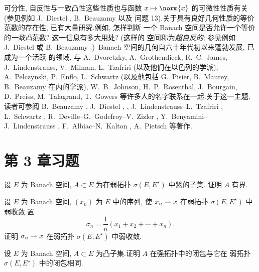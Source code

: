 可分性, 自反性与一致凸性这些性质也与函数 $x\mapsto\norm{x}$ 的可微性性质有关
(参见例如 J.~Diestel , B.~Beauzamy  以及
问题 13).关于具有良好几何性质的等价范数的存在性, 已有大量研究.例如, 怎样判断
一个 Banach 空间是否允许一个等价的\emph{一致凸}范数? 这一信息有多大用处? (这样的
空间称为\emph{超自反的}; 参见例如 J.~Diestel  或 B.~Beauzamy
.)\ Banach 空间的几何自六十年代初以来蓬勃发展, 已成为一个活跃
的领域, 与 A.~Dvoretzky, A.~Grothendieck, R.~C.~James, J.~Lindenstrauss, V.~Milman, L.~Tzafriri (以及他们在以色列的学派), A.~Pelczynski, P.~Enflo, L.~Schwartz (以及他包括 G.~Pisier, B.~Maurey, B.~Beauzamy 在内的学派), W.~B.~Johnson, H.~P.~Rosenthal, J.~Bourgain, D.~Preiss, M.~Talagrand, T.~Gowers 等许多人的名字联系在一起.关于这一主题, 读者可参阅 B.~Beauzamy
, J.~Diestel , , J.~Lindenstrauss--L.~Tzafriri , L.~Schwartz
, R.~Deville--G.~Godefroy--V.~Zizler , Y.~Benyamini--J.~Lindenstrauss , F.~Albiac--N.~Kalton
, A.~Pietsch  等著作.

\section*{第 3 章习题}

\begin{exercise}
\label{exer:3.1}
设 $E$ 为 Banach 空间, $A\subset E$ 为在弱拓扑 $\sigma(E,E^\star)$ 中紧的子集.
证明 $A$ 有界.
\end{exercise}

\begin{exercise}
\label{exer:3.2}
设 $E$ 为 Banach 空间, $(x_n)$ 为 $E$ 中的序列, 使 $x_n\rightharpoonup x$ 在弱拓扑
$\sigma(E,E^\star)$ 中弱收敛.置
\begin{equation*}
\sigma_n=\frac1n(x_1+x_2+\cdots+x_n).
\end{equation*}
证明 $\sigma_n\rightharpoonup x$ 在弱拓扑 $\sigma(E,E^\star)$ 中弱收敛.
\end{exercise}

\begin{exercise}
\label{exer:3.3}
设 $E$ 为 Banach 空间, $A\subset E$ 为凸子集.证明 $A$ 在强拓扑中的闭包与它在
弱拓扑 $\sigma(E,E^\star)$ 中的闭包相同.
\end{exercise}

